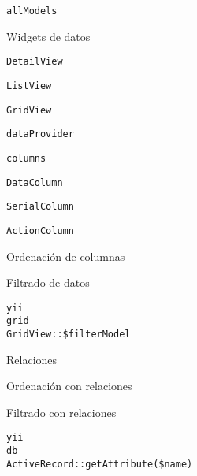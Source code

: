 \begin{longenum}
\begin{longenum}
\begin{longenum}
            \begin{longenum}
                \item \texttt{allModels}
            \end{longenum}
        \end{longenum}
        \item Widgets de datos
        \begin{longenum}
            \item \texttt{DetailView}
            \item \texttt{ListView}
            \item \texttt{GridView}
            \begin{longenum}
                \item \texttt{dataProvider}
                \item \texttt{columns}
                \begin{longenum}
                    \item \texttt{DataColumn}
                    \item \texttt{SerialColumn}
                    \item \texttt{ActionColumn}
                \end{longenum}
                \item Ordenación de columnas
                \item Filtrado de datos
                \begin{longenum}
                    \item \texttt{yii\\grid\\GridView::\$filterModel}
                \end{longenum}
                \item Relaciones
                \begin{longenum}
                    \item Ordenación con relaciones
                    \item Filtrado con relaciones
                    \begin{longenum}
                        \item \texttt{yii\\db\\ActiveRecord::getAttribute(\$name)}
                    \end{longenum}
                \end{longenum}
            \end{longenum}

\end{longenum}
\end{longenum}
\end{longenum}
